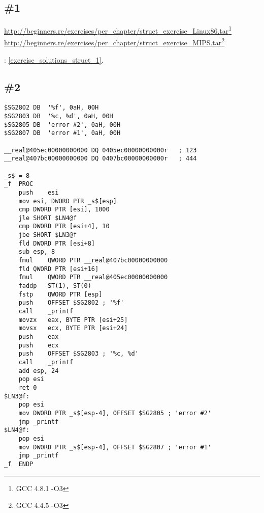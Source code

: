 \section{\Exercises}

\subsection{\Exercise \#1}
\label{exercise_struct_1}

\url{http://beginners.re/exercises/per_chapter/struct_exercise_Linux86.tar}\footnote{GCC 4.8.1 -O3}\\
\url{http://beginners.re/exercises/per_chapter/struct_exercise_MIPS.tar}\footnote{GCC 4.4.5 -O3}\\

\Answer{}: \ref{exercise_solutions_struct_1}.

\subsection{\Exercise \#2}
\label{exercise_struct_2}


\begin{lstlisting}[caption=\Optimizing MSVC 2010]
$SG2802	DB	'%f', 0aH, 00H
$SG2803	DB	'%c, %d', 0aH, 00H
$SG2805	DB	'error #2', 0aH, 00H
$SG2807	DB	'error #1', 0aH, 00H

__real@405ec00000000000 DQ 0405ec00000000000r	; 123
__real@407bc00000000000 DQ 0407bc00000000000r	; 444

_s$ = 8
_f	PROC
	push	esi
	mov	esi, DWORD PTR _s$[esp]
	cmp	DWORD PTR [esi], 1000
	jle	SHORT $LN4@f
	cmp	DWORD PTR [esi+4], 10
	jbe	SHORT $LN3@f
	fld	DWORD PTR [esi+8]
	sub	esp, 8
	fmul	QWORD PTR __real@407bc00000000000
	fld	QWORD PTR [esi+16]
	fmul	QWORD PTR __real@405ec00000000000
	faddp	ST(1), ST(0)
	fstp	QWORD PTR [esp]
	push	OFFSET $SG2802 ; '%f'
	call	_printf
	movzx	eax, BYTE PTR [esi+25]
	movsx	ecx, BYTE PTR [esi+24]
	push	eax
	push	ecx
	push	OFFSET $SG2803 ; '%c, %d'
	call	_printf
	add	esp, 24
	pop	esi
	ret	0
$LN3@f:
	pop	esi
	mov	DWORD PTR _s$[esp-4], OFFSET $SG2805 ; 'error #2'
	jmp	_printf
$LN4@f:
	pop	esi
	mov	DWORD PTR _s$[esp-4], OFFSET $SG2807 ; 'error #1'
	jmp	_printf
_f	ENDP
\end{lstlisting}

